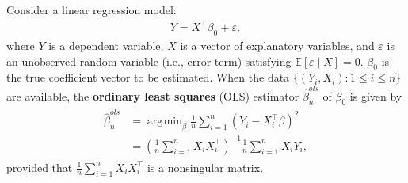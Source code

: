 \documentclass[10.5pt, A4paper, openany, uplatex]{book}
\newcommand{\eps}{\varepsilon}
\newcommand{\E}{\mathbb{E}}
\renewcommand{\hat}{\widehat}
\numberwithin{equation}{section}
\DeclareMathOperator*{\argmin}{\arg\!\min}
\begin{document}
Consider a linear regression model:
\begin{align}\label{eq:linmodel}
	Y = X^\top \beta_0 + \eps, 
\end{align}
where $Y$ is a dependent variable, $X$ is a vector of explanatory variables, and $\eps$ is an unobserved random variable (i.e., error term) satisfying $\E[\eps \mid X] = 0$.
$\beta_0$ is the true coefficient vector to be estimated.
When the data $\{(Y_i, X_i): 1 \le i \le n\}$ are available, the \textbf{ordinary least squares} (OLS) estimator $\hat \beta_n^{ols}$ of $\beta_0$ is given by
\begin{align}\label{eq:ols}
\begin{split}
	\hat \beta_n^{ols} 
	& = \argmin_{\beta} \frac{1}{n}\sum_{i = 1}^n (Y_i - X_i^\top \beta)^2 \\
	& = \left(\frac{1}{n}\sum_{i = 1}^n X_i X_i^\top \right)^{-1}\frac{1}{n}\sum_{i = 1}^n X_i Y_i,
\end{split}
\end{align}
provided that $\frac{1}{n}\sum_{i = 1}^n X_i X_i^\top$ is a nonsingular matrix. 
\end{document}
